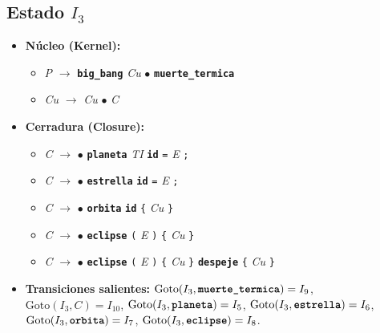 \documentclass[12pt, letterpaper]{article}
\begin{document}
\subsection*{Estado $I_{3}$ }
\begin{itemize}\setlength{\itemsep}{1pt}\setlength{\parskip}{0pt}
\item \textbf{Núcleo (Kernel):}
\begin{itemize}\setlength{\itemsep}{1pt}\setlength{\parskip}{0pt}
    \item \textit{P} $\to$ \textbf{\texttt{big\_bang}} \textit{Cu} $\bullet$ \textbf{\texttt{muerte\_termica}}
    \item \textit{Cu} $\to$ \textit{Cu} $\bullet$ \textit{C}
\end{itemize}
\item \textbf{Cerradura (Closure):}
\begin{itemize}\setlength{\itemsep}{1pt}\setlength{\parskip}{0pt}
    \item \textit{C} $\to$ $\bullet$ \textbf{\texttt{planeta}} \textit{TI} \textbf{\texttt{id}} \texttt{=} \textit{E} \texttt{;}
    \item \textit{C} $\to$ $\bullet$ \textbf{\texttt{estrella}} \textbf{\texttt{id}} \texttt{=} \textit{E} \texttt{;}
    \item \textit{C} $\to$ $\bullet$ \textbf{\texttt{orbita}} \textbf{\texttt{id}} \texttt{\{} \textit{Cu} \texttt{\}}
    \item \textit{C} $\to$ $\bullet$ \textbf{\texttt{eclipse}} \texttt{(} \textit{E} \texttt{)} \texttt{\{} \textit{Cu} \texttt{\}}
    \item \textit{C} $\to$ $\bullet$ \textbf{\texttt{eclipse}} \texttt{(} \textit{E} \texttt{)} \texttt{\{} \textit{Cu} \texttt{\}} \textbf{\texttt{despeje}} \texttt{\{} \textit{Cu} \texttt{\}}
\end{itemize}
\item \textbf{Transiciones salientes:} $\text{Goto}(I_{3}, \textbf{\texttt{muerte\_termica}}) = I_{9}$, \quad $\text{Goto}(I_{3}, \textit{C}) = I_{10}$, \quad $\text{Goto}(I_{3}, \textbf{\texttt{planeta}}) = I_{5}$, \quad $\text{Goto}(I_{3}, \textbf{\texttt{estrella}}) = I_{6}$, \quad $\text{Goto}(I_{3}, \textbf{\texttt{orbita}}) = I_{7}$, \quad $\text{Goto}(I_{3}, \textbf{\texttt{eclipse}}) = I_{8}$.
\end{itemize}
\vspace{2pt}
\end{document}
